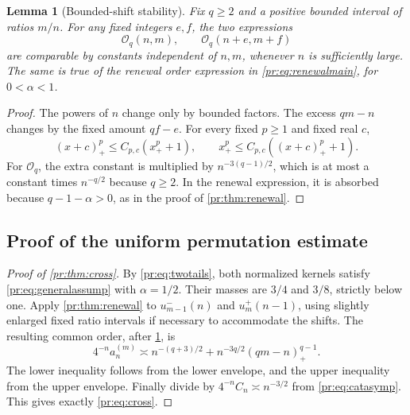 \documentclass[11pt,a4paper]{article}
\newtheorem{lemma}[lemma]{Lemma}
\theoremstyle{definition}\newaliascnt{definition}{theorem}
\theoremstyle{remark}\newaliascnt{remark}{theorem}
\newcommand{\prpos}[1]{(#1)_+}
\begin{document}
\begin{lemma}[Bounded-shift stability]\label{pr:lem:shift}
Fix $q\ge2$ and a positive bounded interval of ratios $m/n$. For any fixed
integers $e,f$, the two expressions
\[
 \mathcal O_q(n,m),\qquad \mathcal O_q(n+e,m+f)
\]
are comparable by constants independent of $n,m$, whenever $n$ is
sufficiently large. The same is true of the renewal order expression in
\eqref{pr:eq:renewalmain}, for $0<\alpha<1$.
\end{lemma}
\begin{proof}
The powers of $n$ change only by bounded factors. The excess $qm-n$ changes
by the fixed amount $qf-e$. For every fixed $p\ge1$ and fixed real $c$,
\[
 (x+c)_+^p\le C_{p,c}(x_+^p+1),\qquad
 x_+^p\le C_{p,c}((x+c)_+^p+1).
\]
For $\mathcal O_q$, the extra constant is multiplied by $n^{-3(q-1)/2}$,
which is at most a constant times $n^{-q/2}$ because $q\ge2$. In the renewal
expression, it is absorbed because $q-1-\alpha>0$, as in the proof of
\cref{pr:thm:renewal}.
\end{proof}

\subsection{Proof of the uniform permutation estimate}
\begin{proof}[Proof of \cref{pr:thm:cross}]
By \eqref{pr:eq:twotails}, both normalized kernels satisfy
\eqref{pr:eq:generalassump} with $\alpha=1/2$. Their masses are $3/4$ and
$3/8$, strictly below one. Apply \cref{pr:thm:renewal} to $u^-_{m-1}(n)$ and
$u^+_m(n-1)$, using slightly enlarged fixed ratio intervals if necessary to
accommodate the shifts. The resulting common order, after
\cref{pr:lem:shift}, is
\begin{equation}
 4^{-n}a_n^{(m)}\asymp
 n^{-(q+3)/2}+n^{-3q/2}\prpos{qm-n}^{q-1}.
 \label{pr:eq:countsnormalized}
\end{equation}
The lower inequality follows from the lower envelope, and the upper
inequality from the upper envelope. Finally divide by
$4^{-n}C_n\asymp n^{-3/2}$ from \eqref{pr:eq:catasymp}. This gives exactly
\eqref{pr:eq:cross}.
\end{proof}
\end{document}
